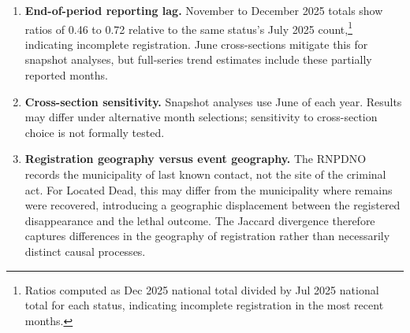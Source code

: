 \begin{enumerate}
  \item \textbf{End-of-period reporting lag.}
        November to December 2025 totals show ratios of 0.46 to 0.72 relative to the same status's July 2025 count,\footnote{Ratios computed as Dec 2025 national total divided by Jul 2025 national total for each status, indicating incomplete registration in the most recent months.} indicating incomplete registration.
        June cross-sections mitigate this for snapshot analyses, but full-series trend estimates include these partially reported months.

  \item \textbf{Cross-section sensitivity.}
        Snapshot analyses use June of each year.
        Results may differ under alternative month selections; sensitivity to cross-section choice is not formally tested.

  \item \textbf{Registration geography versus event geography.}
        The RNPDNO records the municipality of last known contact, not the site of the criminal act.
        For Located Dead, this may differ from the municipality where remains were recovered, introducing a geographic displacement between the registered disappearance and the lethal outcome.
        The Jaccard divergence therefore captures differences in the geography of registration rather than necessarily distinct causal processes.

\end{enumerate}